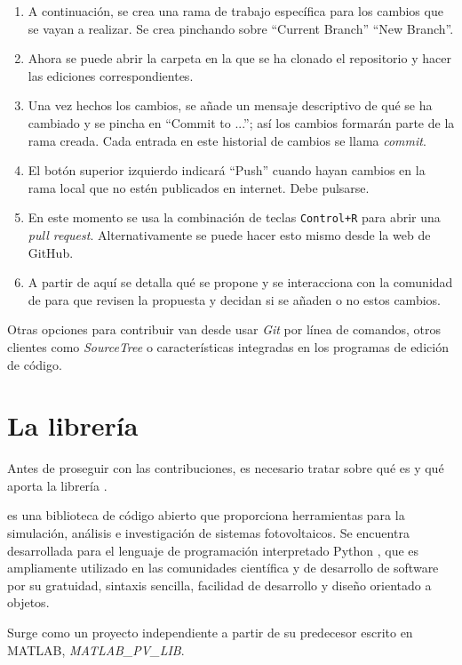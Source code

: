 \begin{enumerate}
    \item A continuación, se crea una \gls{rama} de trabajo específica para los cambios que se vayan a realizar. Se crea pinchando sobre ``Current Branch'' \textrightarrow ``New Branch''.
    \item Ahora se puede abrir la carpeta en la que se ha clonado el repositorio y hacer las ediciones correspondientes.
    \item Una vez hechos los cambios, se añade un mensaje descriptivo de qué se ha cambiado y se pincha en ``Commit to ...''; así los cambios formarán parte de la rama creada. Cada entrada en este historial de cambios se llama \textit{\gls{commit}}.
    \item El botón superior izquierdo indicará ``Push'' cuando hayan cambios en la rama local que no estén publicados en internet. Debe pulsarse.
    \item En este momento se usa la combinación de teclas \texttt{Control+R} para abrir una \textit{\gls{pull request}}. Alternativamente se puede hacer esto mismo desde la web de GitHub.
    \item A partir de aquí se detalla qué se propone y se interacciona con la comunidad de \pvlibpy{} para que revisen la propuesta y decidan si se añaden o no estos cambios.
\end{enumerate}

Otras opciones para contribuir van desde usar \textit{Git} por \gls{línea de comandos}, otros clientes como \textit{SourceTree} o características integradas en los programas de edición de código.

\section{La librería \pvlibpy} \label{sct:pvlib}

Antes de proseguir con las contribuciones, es necesario tratar sobre qué es y qué aporta la \gls{librería} \pvlibpy.

\pvlibpy{} es una biblioteca de código abierto que proporciona herramientas para la simulación, análisis e investigación de sistemas fotovoltaicos. Se encuentra desarrollada para el lenguaje de programación interpretado \gls{Python} \cite{CS-R9526}, que es ampliamente utilizado en las comunidades científica y de desarrollo de \gls{software} por su gratuidad, sintaxis sencilla, facilidad de desarrollo y diseño orientado a objetos.

Surge como un proyecto independiente a partir de su predecesor escrito en \gls{MATLAB}, \textit{MATLAB\_PV\_LIB}.

